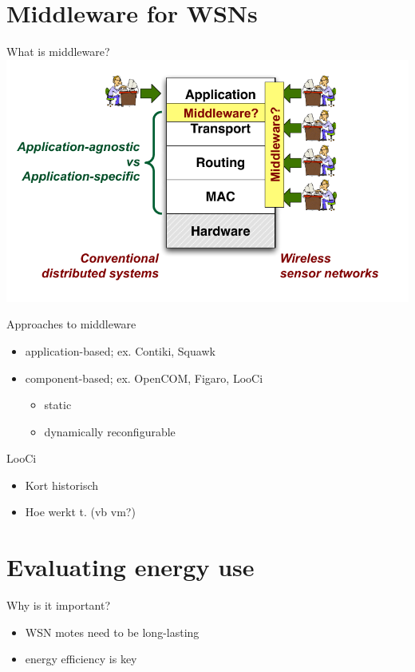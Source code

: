 \documentclass[presentation, bigger]{beamer}
\begin{document}
\section{Middleware for WSNs}
\label{sec-2}
\begin{frame}[label=sec-2-1]{What is middleware?}
\includegraphics[width=\textwidth,keepaspectration=true]{middleware}
\end{frame}

\begin{frame}[label=sec-2-2]{Approaches to middleware}
\begin{itemize}
\item application-based; ex. Contiki, Squawk
\item component-based; ex. OpenCOM, Figaro, LooCi
\begin{itemize}
\item static
\item dynamically reconfigurable
\end{itemize}
\end{itemize}
\end{frame}

\begin{frame}[label=sec-2-3]{LooCi}
\begin{itemize}
\item Kort historisch
\item Hoe werkt t. (vb vm?)
\end{itemize}
\end{frame}
\section{Evaluating energy use}
\label{sec-3}

\begin{frame}[label=sec-3-1]{Why is it important?}
\begin{itemize}
\item WSN motes need to be long-lasting
\item energy efficiency is key
\end{itemize}
\end{frame}
\end{document}
